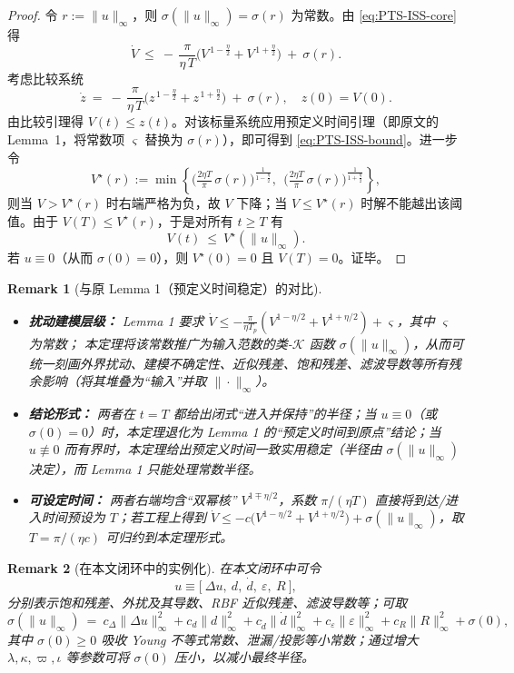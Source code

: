 \documentclass[pdflatex,sn-mathphys-num]{sn-jnl}%
\theoremstyle{thmstyleone}%
\theoremstyle{thmstyletwo}%
\newtheorem{remark}{Remark}%
\theoremstyle{thmstylethree}%
\begin{document}
	\begin{proof}
	令 $r:=\|u\|_\infty$，则 $\sigma(\|u\|_\infty)=\sigma(r)$ 为常数。由 \cref{eq:PTS-ISS-core} 得
	\[
	\dot V\ \le\ -\,\frac{\pi}{\eta\,T}\Big(V^{\,1-\frac{\eta}{2}}+V^{\,1+\frac{\eta}{2}}\Big)\ +\ \sigma(r).
	\]
	考虑比较系统
	\[
	\dot z\ =\ -\,\frac{\pi}{\eta\,T}\Big(z^{\,1-\frac{\eta}{2}}+z^{\,1+\frac{\eta}{2}}\Big)\ +\ \sigma(r),\quad z(0)=V(0).
	\]
	由比较引理得 $V(t)\le z(t)$。对该标量系统应用预定义时间引理（即原文的 Lemma~1，将常数项 $\varsigma$ 替换为 $\sigma(r)$），即可得到 \cref{eq:PTS-ISS-bound}。进一步令
\[
V^\star(r):=\min\!\left\{
\Big(\tfrac{2\eta T}{\pi}\,\sigma(r)\Big)^{\!\frac{1}{1-\frac{\eta}{2}}},
\ \ 
\Big(\tfrac{2\eta T}{\pi}\,\sigma(r)\Big)^{\!\frac{1}{1+\frac{\eta}{2}}}
\right\},
\]
则当 $V>V^\star(r)$ 时右端严格为负，故 $V$ 下降；当 $V\le V^\star(r)$ 时解不能越出该阈值。由于 $V(T)\le V^\star(r)$，于是对所有 $t\ge T$ 有
\[
V(t)\ \le\ V^\star(\|u\|_\infty).
\]
若 $u\equiv0$（从而 $\sigma(0)=0$），则 $V^\star(0)=0$ 且 $V(T)=0$。证毕。

	\end{proof}
	
	\begin{remark}[与原 Lemma 1（预定义时间稳定）的对比]
	\begin{itemize}
	  \item \textbf{扰动建模层级：} Lemma 1 要求
	  $\dot V \le -\frac{\pi}{\eta T_p}(V^{1-\eta/2}+V^{1+\eta/2})+\varsigma$，其中 $\varsigma$ 为常数；
	  本定理将该常数推广为输入范数的类-$\mathcal{K}$ 函数 $\sigma(\|u\|_\infty)$，从而可统一刻画外界扰动、建模不确定性、近似残差、饱和残差、滤波导数等所有残余影响（将其堆叠为“输入”并取 $\|\cdot\|_\infty$）。
	  \item \textbf{结论形式：} 两者在 $t=T$ 都给出闭式“进入并保持”的半径；当 $u\equiv0$（或 $\sigma(0)=0$）时，本定理退化为 Lemma 1 的“预定义时间到原点”结论；当 $u\not\equiv0$ 而有界时，本定理给出预定义时间一致实用稳定（半径由 $\sigma(\|u\|_\infty)$ 决定），而 Lemma 1 只能处理常数半径。
	  \item \textbf{可设定时间：} 两者右端均含“双幂核” $V^{1\mp\eta/2}$，系数 $\pi/(\eta T)$ 直接将到达/进入时间预设为 $T$；若工程上得到
	  $\dot V\le -c\big(V^{1-\eta/2}+V^{1+\eta/2}\big)+\sigma(\|u\|_\infty)$，取 $T=\pi/(\eta c)$ 可归约到本定理形式。
	\end{itemize}
	\end{remark}
	
	\begin{remark}[在本文闭环中的实例化]
	在本文闭环中可令
	\[
	u \equiv \big[\ \Delta u,\ d,\ \dot d,\ \varepsilon,\ R\ \big],
	\]
	分别表示饱和残差、外扰及其导数、RBF 近似残差、滤波导数等；可取
	\[
	\sigma(\|u\|_\infty)\ =\ c_\Delta\|\Delta u\|_\infty^2
	+c_d\|d\|_\infty^2
	+c_{\dot d}\|\dot d\|_\infty^2
	+c_\varepsilon\|\varepsilon\|_\infty^2
	+c_R\|R\|_\infty^2
	+\sigma(0),
	\]
	其中 $\sigma(0)\ge0$ 吸收 Young 不等式常数、泄漏/投影等小常数；通过增大 $\lambda,\kappa,\varpi,\iota$ 等参数可将 $\sigma(0)$ 压小，以减小最终半径。
	\end{remark}
	
\end{document}
